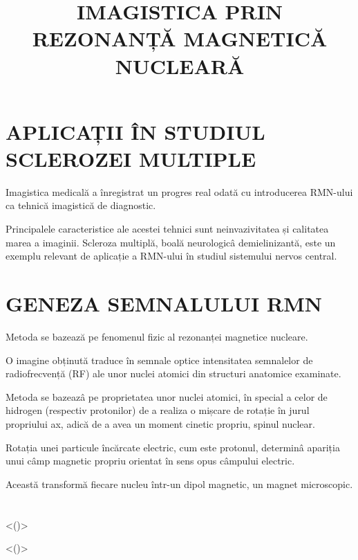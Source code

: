 \documentclass{article}
\title{IMAGISTICA PRIN REZONANȚĂ MAGNETICĂ NUCLEARĂ}
\date{}
\author{}
\begin{document}
    \maketitle

    \section{APLICAȚII ÎN STUDIUL SCLEROZEI MULTIPLE}
    
    Imagistica medicală a înregistrat un progres real odată cu introducerea RMN-ului ca tehnică imagistică de diagnostic.

    Principalele caracteristice ale acestei tehnici sunt neinvazivitatea și calitatea marea a imaginii. Scleroza multiplă, boală neurologicâ demielinizantă, este un exemplu relevant de aplicație a RMN-ului în studiul sistemului nervos central. 

    \section{GENEZA SEMNALULUI RMN}
        Metoda se bazează pe fenomenul fizic al rezonanței magnetice nucleare. 
        
        O imagine obținută traduce în semnale optice intensitatea semnalelor de radiofrecvență (RF) ale unor nuclei atomici din structuri anatomice examinate. 
        
        Metoda se bazeazâ pe proprietatea unor nuclei atomici, în special a celor de hidrogen (respectiv protonilor) de a realiza o mișcare de rotație în jurul propriului ax, adică de a avea un moment cinetic propriu, spinul nuclear.
        
        Rotația unei particule încărcate electric, cum este protonul, determinâ apariția unui câmp magnetic propriu orientat în sens opus câmpului electric.
        
        Această transformă fiecare nucleu într-un dipol magnetic, un magnet microscopic.

        \section{}
        <()>

        <()>
\end{document}
